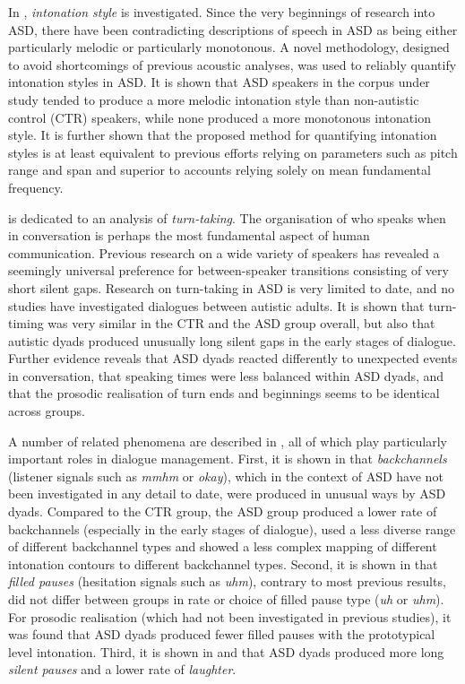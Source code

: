 	In , \emph{intonation style} is investigated. Since the very beginnings of research into ASD, there have been contradicting descriptions of speech in ASD as being either particularly melodic or particularly monotonous. A novel methodology, designed to avoid shortcomings of previous acoustic analyses, was used to reliably quantify intonation styles in ASD. It is shown that ASD speakers in the corpus under study tended to produce a more melodic intonation style than non-autistic control (CTR) speakers, while none produced a more monotonous intonation style. It is further shown that the proposed method for quantifying intonation styles is at least equivalent to previous efforts relying on parameters such as pitch range and span and superior to accounts relying solely on mean fundamental frequency.
	
	 is dedicated to an analysis of \emph {turn-taking}. The organisation of who speaks when in conversation is perhaps the most fundamental aspect of human communication. Previous research on a wide variety of speakers has revealed a seemingly universal preference for between-speaker transitions consisting of very short silent gaps. Research on turn-taking in ASD is very limited to date, and no studies have investigated dialogues between autistic adults. It is shown that turn-timing was very similar in the CTR and the ASD group overall, but also that autistic dyads produced unusually long silent gaps in the early stages of dialogue. Further evidence reveals that ASD dyads reacted differently to unexpected events in conversation, that speaking times were less balanced within ASD dyads, and that the prosodic realisation of turn ends and beginnings seems to be identical across groups. 
	
	A number of related phenomena are described in , all of which play particularly important roles in dialogue management. First, it is shown in  that \emph{backchannels} (listener signals such as \textit{mmhm} or \textit{okay}), which in the context of ASD have not been investigated in any detail to date, were produced in unusual ways by ASD dyads. Compared to the CTR group, the ASD group produced a lower rate of backchannels (especially in the early stages of dialogue), used a less diverse range of different backchannel types and showed a less complex mapping of different intonation contours to different backchannel types. Second, it is shown in  that \emph{filled pauses} (hesitation signals such as \textit{uhm}), contrary to most previous results, did not differ between groups in rate or choice of filled pause type (\textit{uh} or \textit{uhm}). For prosodic realisation (which had not been investigated in previous studies), it was found that ASD dyads produced fewer filled pauses with the prototypical level intonation.	Third, it is shown in  and  that ASD dyads produced more long \emph{silent pauses} and a lower rate of \emph{laughter}.
	
